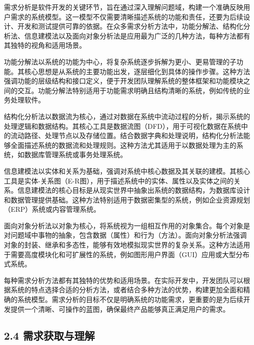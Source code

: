 需求分析是软件开发的关键环节，旨在通过深入理解问题域，构建一个准确反映用户需求的系统模型。这一模型不仅需要清晰描述系统的功能和责任，还要为后续设计、开发和测试提供可靠的依据。在众多需求分析方法中，功能分解法、结构化分析法、信息建模法以及面向对象分析法是应用最为广泛的几种方法，每种方法都有其独特的视角和适用场景。


功能分解法以系统的功能为中心，将复杂系统逐步拆解为更小、更易管理的子功能。其核心思想是从系统的主要功能出发，逐层细化到具体的操作步骤。这种方法强调功能的层级结构和接口定义，便于开发团队理解系统的整体框架和功能模块之间的交互。功能分解法特别适用于功能需求明确且结构清晰的系统，例如传统的业务处理软件。


结构化分析法以数据流为核心，通过对数据在系统中流动过程的分析，揭示系统的处理逻辑和数据结构。其核心工具是数据流图（DFD），用于可视化数据在系统中的流动路径、处理节点以及存储位置。结合数据字典和处理说明，结构化分析法能够全面描述系统的数据流和处理规则。这种方法尤其适用于以数据处理为主的系统，如数据库管理系统或事务处理系统。


信息建模法以实体和关系为基础，强调对系统中核心数据及其关联的建模。其核心工具是实体-关系图（E-R图），用于描述系统中的实体、属性以及实体之间的关系。信息建模法的核心目标是从现实世界中抽象出系统的数据结构，为数据库设计和数据管理提供基础。这种方法特别适用于数据密集型的系统，例如企业资源规划（ERP）系统或内容管理系统。


面向对象分析法以对象为核心，将系统视为一组相互作用的对象集合。每个对象是对问题域中事物的抽象，包含数据（属性）和行为（方法）。面向对象分析法强调对象的封装、继承和多态性，能够有效地模拟现实世界的复杂关系。这种方法适用于需要高度模块化和可扩展性的系统，例如图形用户界面（GUI）应用或大型分布式系统。

每种需求分析方法都有其独特的优势和适用场景。在实际开发中，开发团队可以根据系统的特点选择合适的分析方法，或者结合多种方法的优势，构建更加全面和精确的系统模型。需求分析的目标不仅是明确系统的功能需求，更重要的是为后续开发提供一个清晰、可操作的蓝图，确保最终产品能够真正满足用户的需求。

\hypertarget{ux9700ux6c42ux83b7ux53d6ux4e0eux7406ux89e3}{%
\subsection{2.4 需求获取与理解}\label{ux9700ux6c42ux83b7ux53d6ux4e0eux7406ux89e3}}

